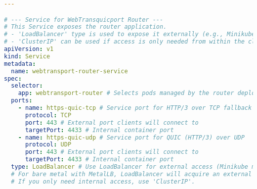 \begin{lstlisting}[breaklines=true, caption={Router Kubernetes Deployment}, language=yaml]
---

# --- Service for WebTransquicport Router ---
# This Service exposes the router application.
# - 'LoadBalancer' type is used to expose it externally (e.g., Minikube will provide a host port).
# - 'ClusterIP' can be used if access is only needed from within the cluster.
apiVersion: v1
kind: Service
metadata:
  name: webtransport-router-service
spec:
  selector:
    app: webtransport-router # Selects pods managed by the router deployment
  ports:
    - name: https-quic-tcp # Service port for HTTP/3 over TCP fallback
      protocol: TCP
      port: 443 # External port clients will connect to
      targetPort: 4433 # Internal container port
    - name: https-quic-udp # Service port for QUIC (HTTP/3) over UDP
      protocol: UDP
      port: 443 # External port clients will connect to
      targetPort: 4433 # Internal container port
  type: LoadBalancer # Use LoadBalancer for external access (Minikube maps to host port)
  # For bare metal with MetalLB, LoadBalancer will acquire an external IP.
  # If you only need internal access, use 'ClusterIP'.

\end{lstlisting}


